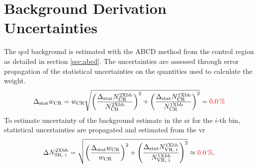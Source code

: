 \section{Background Derivation Uncertainties}
The \ac{qcd} background is estimated with the ABCD method from the control region as detailed in section \ref{sec:abcd}. The uncertainties are assessed through error propagation of the statistical uncertainties on the quantities used to calculate the weight. 
\begin{equation}
    \Delta_\text{stat} w_\text{CR} = w_\text{CR} \sqrt{
        \left(\frac{\Delta_\text{stat} N_\text{CR}^\text{2Xbb}}{N_\text{CR}^\text{2Xbb}}\right)^2
        +
        \left(\frac{\Delta_\text{stat} N_\text{CR}^\text{1Xbb}}{N_\text{CR}^\text{1Xbb}}\right)^2
        }
        = \textcolor{red}{\qty[]{0.0}{\percent}}
\end{equation}
To estimate uncertainty of the background estimate in the \ac{sr} for the $i$-th bin, statistical uncertainties are propagated and estimated from the \ac{vr}
\begin{equation}
    \Delta N_\text{SR, i}^\text{2Xbb} 
    =   
    \sqrt{
        \left(\frac{\Delta_\text{stat} w_\text{CR}}{w_\text{CR}}\right)^2
        +
        \left(\frac{\Delta_\text{stat} N_\text{VR, i}^\text{1Xbb}}{N_\text{VR, i}^\text{1Xbb}}\right)^2
        }
        \approx \textcolor{red}{\qty[]{0.0}{\percent}}.
\end{equation}


